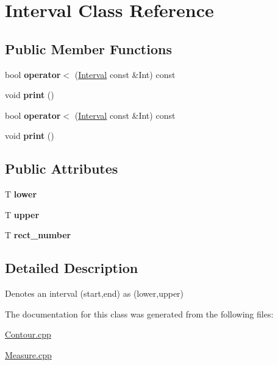 \hypertarget{classInterval}{}\section{Interval Class Reference}
\label{classInterval}
\subsection*{Public Member Functions}
\begin{DoxyCompactItemize}
\item 
\mbox{\label{classInterval_abfbe77932f9ffa94b5887253c37b1a19}} 
bool {\bfseries operator$<$} (\hyperlink{classInterval}{Interval} const \&Int) const
\item 
\mbox{\label{classInterval_a3c5b549e7dcff526f13fcdb28d5c10cf}} 
void {\bfseries print} ()
\item 
\mbox{\label{classInterval_abfbe77932f9ffa94b5887253c37b1a19}} 
bool {\bfseries operator$<$} (\hyperlink{classInterval}{Interval} const \&Int) const
\item 
\mbox{\label{classInterval_a3c5b549e7dcff526f13fcdb28d5c10cf}} 
void {\bfseries print} ()
\end{DoxyCompactItemize}
\subsection*{Public Attributes}
\begin{DoxyCompactItemize}
\item 
\mbox{\label{classInterval_a4f59d167f721e715639f6e557a343d46}} 
T {\bfseries lower}
\item 
\mbox{\label{classInterval_ad84903b542d3a196d94f8503a199f291}} 
T {\bfseries upper}
\item 
\mbox{\label{classInterval_a4dd1034101c0b1df1ae50098727d223f}} 
T {\bfseries rect\+\_\+number}
\end{DoxyCompactItemize}


\subsection{Detailed Description}
Denotes an interval (start,end) as (lower,upper) 

The documentation for this class was generated from the following files\+:\begin{DoxyCompactItemize}
\item 
\hyperlink{Contour_8cpp}{Contour.\+cpp}\item 
\hyperlink{Measure_8cpp}{Measure.\+cpp}\end{DoxyCompactItemize}
